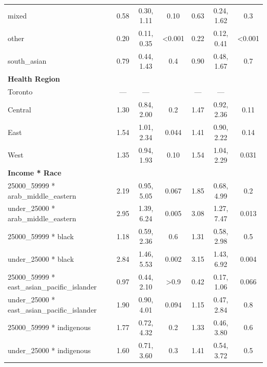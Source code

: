 \documentclass[
  letterpaper,
  DIV=11,
  numbers=noendperiod]{scrartcl}
\begin{document}
\begin{longtable}{lcccccc}
\hspace{1em}mixed & 0.58 & 0.30, 1.11 & 0.10 & 0.63 & 0.24, 1.62 & 0.3\\
\hspace{1em}other & 0.20 & 0.11, 0.35 & <0.001 & 0.22 & 0.12, 0.41 & <0.001\\
\hspace{1em}south\_asian & 0.79 & 0.44, 1.43 & 0.4 & 0.90 & 0.48, 1.67 & 0.7\\
\textbf{Health Region} &  &  &  &  &  & \\
\hspace{1em}Toronto & — & — &  & — & — & \\
\hspace{1em}Central & 1.30 & 0.84, 2.00 & 0.2 & 1.47 & 0.92, 2.36 & 0.11\\
\hspace{1em}East & 1.54 & 1.01, 2.34 & 0.044 & 1.41 & 0.90, 2.22 & 0.14\\
\hspace{1em}West & 1.35 & 0.94, 1.93 & 0.10 & 1.54 & 1.04, 2.29 & 0.031\\
\textbf{Income * Race} &  &  &  &  &  & \\
\hspace{1em}25000\_59999 * arab\_middle\_eastern & 2.19 & 0.95, 5.05 & 0.067 & 1.85 & 0.68, 4.99 & 0.2\\
\hspace{1em}under\_25000 * arab\_middle\_eastern & 2.95 & 1.39, 6.24 & 0.005 & 3.08 & 1.27, 7.47 & 0.013\\
\hspace{1em}25000\_59999 * black & 1.18 & 0.59, 2.36 & 0.6 & 1.31 & 0.58, 2.98 & 0.5\\
\hspace{1em}under\_25000 * black & 2.84 & 1.46, 5.53 & 0.002 & 3.15 & 1.43, 6.92 & 0.004\\
\hspace{1em}25000\_59999 * east\_asian\_pacific\_islander & 0.97 & 0.44, 2.10 & >0.9 & 0.42 & 0.17, 1.06 & 0.066\\
\hspace{1em}under\_25000 * east\_asian\_pacific\_islander & 1.90 & 0.90, 4.01 & 0.094 & 1.15 & 0.47, 2.84 & 0.8\\
\hspace{1em}25000\_59999 * indigenous & 1.77 & 0.72, 4.32 & 0.2 & 1.33 & 0.46, 3.80 & 0.6\\
\hspace{1em}under\_25000 * indigenous & 1.60 & 0.71, 3.60 & 0.3 & 1.41 & 0.54, 3.72 & 0.5\\

\end{longtable}
\end{document}
